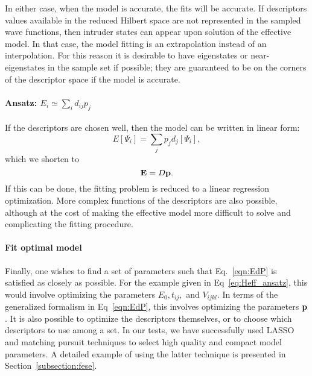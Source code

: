 In either case, when the model is accurate, the fits will be accurate.
If descriptors values available in the reduced Hilbert space are not represented in the sampled wave functions, then intruder states can appear upon solution of the effective model. 
In that case, the model fitting is an extrapolation instead of an interpolation.
For this reason it is desirable to have eigenstates or near-eigenstates in the sample set if possible; they are guaranteed to be on the corners of the descriptor space if the model is accurate.


\paragraph{Ansatz: $E_i \simeq \sum_i  d_{ij} p_j$} 
If the descriptors are chosen well, then the model can be written in linear form:
\begin{equation}\label{eq:linearfit_descriptor}
E[\Psi_i] = \sum_j p_j d_j[\Psi_i],	
\end{equation}
which we shorten to 
\begin{equation}
{\bf E} = D{\bf p} .
\label{eqn:EdP}
\end{equation}
If this can be done, the fitting problem is reduced to a linear regression optimization.
More complex functions of the descriptors are also possible, although at the cost of making the effective model more difficult to solve and complicating the fitting procedure.


\paragraph{Fit optimal model}
Finally, one wishes to find a set of parameters such that Eq.~\eqref{eqn:EdP} is satisfied as closely as possible. 
For the example given in Eq~\eqref{eq:Heff_ansatz}, this would involve optimizing the parameters $E_0,t_{ij}, $ and $V_{ijkl}$. 
In terms of the generalized formalism in Eq~\eqref{eqn:EdP}, this involves optimizing the parameters ${\bf p}$. 
It is also possible to optimize the descriptors themselves, or to choose which descriptors to use among a set. 
In our tests, we have successfully used LASSO \cite{Lasso} and matching pursuit techniques \cite{MP_Zhang1993} to select high quality and compact model parameters. 
A detailed example of using the latter technique is presented in Section~\ref{subsection:fese}.


